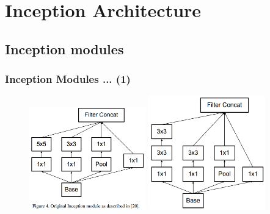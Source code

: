 \documentclass{beamer}
\begin{document}
\section{Inception Architecture}

\subsection{Inception modules}

\begin{frame}
	\frametitle{Inception Modules ... (1)}
	\begin{figure}
		\includegraphics[width=0.45\textwidth]{./figures/edit/inception_org.png}
		\hspace{0.05\textwidth} 
		\includegraphics[width=0.45\textwidth]{./figures/edit/breakdown_01.png}
	\end{figure}
\end{frame}
\end{document}
